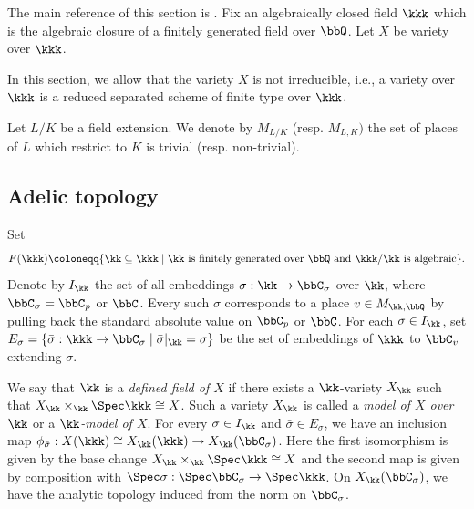     The main reference of this section is \cite{Xie25ZDOsurfaces}.
    Fix an algebraically closed field \(\kkk\) which is the algebraic closure of a finitely generated field over \(\bbQ\).
    Let \(X\) be variety over \(\kkk\).

    In this section, we allow that the variety \(X\) is not irreducible,
    i.e., a variety over \(\kkk\) is a reduced separated scheme of finite type over \(\kkk\).

    Let \(L/K\) be a field extension.
    We denote by \(M_{L/K}\) (resp. \(M_{L,K})\) the set of places of \(L\) which restrict to \(K\) is trivial (resp. non-trivial).


\subsection{Adelic topology}

    \begin{notation}\label{notation:embedding_set_for_adelic_topology}
        Set
        \[ F(\kkk) \coloneqq \{\kk \subseteq \kkk \mid \kk \text{ is finitely generated over } \bbQ \text{ and } \kkk/\kk \text{ is algebraic}\}. \]
        Denote by \(I_\kk\) the set of all embeddings \(\sigma: \kk \to \bbC_\sigma\) over \(\kk\), where \(\bbC_\sigma = \bbC_p\) or \(\bbC\).
        Every such \(\sigma\) corresponds to a place \(v\in M_{\kk,\bbQ}\) by pulling back the standard absolute value on \(\bbC_p\) or \(\bbC\).
        For each \(\sigma\in I_\kk\), set \(E_\sigma = \{\bar{\sigma}: \kkk \to \bbC_\sigma \mid \bar{\sigma}|_\kk = \sigma\}\) be the set of embeddings of \(\kkk\) to \(\bbC_v\) extending \(\sigma\).

        We say that \(\kk\) is a \emph{defined field of \(X\)} if there exists a \(\kk\)-variety \(X_\kk\) such that \(X_\kk \times_{\kk} \Spec \kkk \cong X\).
        Such a variety \(X_\kk\) is called a \emph{model of \(X\) over \(\kk\)} or a \emph{\(\kk\)-model of \(X\)}.
        For every \(\sigma \in I_\kk\) and \(\bar{\sigma} \in E_\sigma\), we have an inclusion map \(\phi_{\bar{\sigma}}: X(\kkk) \cong X_{\kk}(\kkk) \to X_{\kk}(\bbC_{\sigma})\).
        Here the first isomorphism is given by the base change \(X_\kk \times_{\kk} \Spec \kkk \cong X\) and the second map is given by composition with \(\Spec \bar{\sigma}: \Spec \bbC_\sigma \to \Spec \kkk\).
        On \(X_{\kk}(\bbC_\sigma)\), we have the analytic topology induced from the norm on \(\bbC_\sigma\).
    \end{notation}

